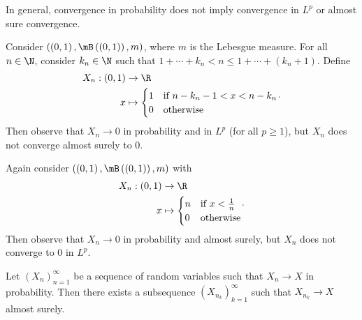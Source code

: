 \documentclass[stat901]{subfiles}
\begin{document}
    \np In general, convergence in probability does not imply convergence in $L^p$ or almost sure convergence.

    \begin{example}{}
        Consider $\left( \left( 0,1 \right),\mB\left( \left( 0,1 \right) \right), m \right)$, where $m$ is the Lebesgue measure. For all $n\in\N$, consider $k_n\in\N$ such that $1+\cdots+k_n < n \leq 1+\cdots+\left( k_n+1 \right)$. Define
        \begin{equation*}
            \begin{aligned}
                X_n : \left( 0,1 \right) & \to \R \\
                x&\mapsto \begin{cases} 1 & \text{if $n-k_n-1 < x < n-k_n$} \\ 0 & \text{otherwise} \end{cases}
            \end{aligned} .
        \end{equation*}
        Then observe that $X_n\to 0$ in probability and in $L^p$ (for all $p\geq 1$), but $X_n$ does not converge almost surely to $0$.
    \end{example}

    \rruleline

    \begin{example}{}
        Again consider $\left( \left( 0,1 \right),\mB\left( \left( 0,1 \right) \right), m \right)$ with
        \begin{equation*}
            \begin{aligned}
                X_n : \left( 0,1 \right) & \to \R \\
                x & \mapsto \begin{cases} n & \text{if $x<\frac{1}{n}$} \\ 0 & \text{otherwise} \end{cases}
            \end{aligned} .
        \end{equation*}
        Then observe that $X_n\to 0$ in probability and almost surely, but $X_n$ does not converge to $0$ in $L^p$.
    \end{example}

    \rruleline

    \begin{prop}{}
        Let $\left( X_{n} \right)^{\infty}_{n=1}$ be a sequence of random variables such that $X_n\to X$ in probability. Then there exists a subsequence $\left( X_{n_k} \right)^{\infty}_{k=1}$ such that $X_{n_k}\to X$ almost surely.
    \end{prop}
\end{document}
